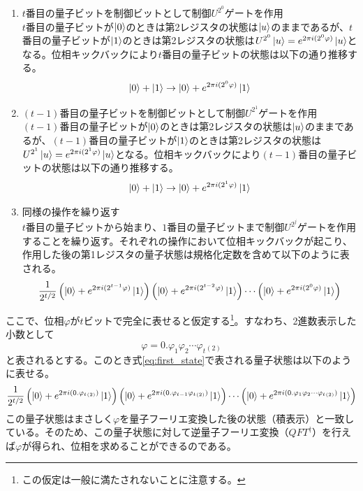 \documentclass[dvipdfmx]{jsarticle}
\begin{document}
\begin{enumerate}[label = (\roman*)]
    \item $t$番目の量子ビットを制御ビットとして制御$U^{2^0}$ゲートを作用\\
    $t$番目の量子ビットが$\ket{0}$のときは第2レジスタの状態は$\ket{u}$のままであるが、$t$番目の量子ビットが$\ket{1}$のときは第2レジスタの状態は$U^{2^0}\ket{u}=e^{2\pi i (2^0\varphi)}\ket{u}$となる。位相キックバックにより$t$番目の量子ビットの状態は以下の通り推移する。
    \[
    \ket{0}+\ket{1}\rightarrow \ket{0}+e^{2\pi i (2^0\varphi)}\ket{1}
    \]
    \item $(t-1)$番目の量子ビットを制御ビットとして制御$U^{2^1}$ゲートを作用\\
    $(t-1)$番目の量子ビットが$\ket{0}$のときは第2レジスタの状態は$\ket{u}$のままであるが、$(t-1)$番目の量子ビットが$\ket{1}$のときは第2レジスタの状態は$U^{2^1}\ket{u}=e^{2\pi i (2^1\varphi)}\ket{u}$となる。位相キックバックにより$(t-1)$番目の量子ビットの状態は以下の通り推移する。
    \[
    \ket{0}+\ket{1}\rightarrow \ket{0}+e^{2\pi i (2^1\varphi)}\ket{1}
    \]
    \item 同様の操作を繰り返す\\
    $t$番目の量子ビットから始まり、$1$番目の量子ビットまで制御$U^{2^j}$ゲートを作用することを繰り返す。それぞれの操作において位相キックバックが起こり、作用した後の第1レジスタの量子状態は規格化定数を含めて以下のように表される。
    \begin{equation}
    \frac{1}{2^{t/2}}\left(\ket{0}+e^{2\pi i (2^{t-1}\varphi)}\ket{1}\right)\left(\ket{0}+e^{2\pi i (2^{t-2}\varphi)}\ket{1}\right)\cdots \left(\ket{0}+e^{2\pi i (2^0\varphi)}\ket{1}\right) \label{eq:first_state}
    \end{equation}
\end{enumerate}
ここで、位相$\varphi$が$t$ビットで完全に表せると仮定する\footnote{この仮定は一般に満たされないことに注意する。}。すなわち、2進数表示した小数として
\[
    \varphi = 0.\varphi_1\varphi_2\cdots \varphi_t{}_{(2)}
\]
と表されるとする。このとき式\ref{eq:first_state}で表される量子状態は以下のように表せる。
\begin{equation}
    \frac{1}{2^{t/2}}\left(\ket{0}+e^{2\pi i (0.\varphi_t{}_{(2)})}\ket{1}\right)\left(\ket{0}+e^{2\pi i (0.\varphi_{t-1}\varphi_t{}_{(2)})}\ket{1}\right)\cdots \left(\ket{0}+e^{2\pi i (0.\varphi_1\varphi_2\cdots \varphi_t{}_{(2)})}\ket{1}\right) \label{eq:exact_state}
\end{equation}
この量子状態はまさしく$\varphi$を量子フーリエ変換した後の状態（積表示）と一致している。そのため、この量子状態に対して逆量子フーリエ変換（$QFT^\dagger$）を行えば$\varphi$が得られ、位相を求めることができるのである。
\end{document}

